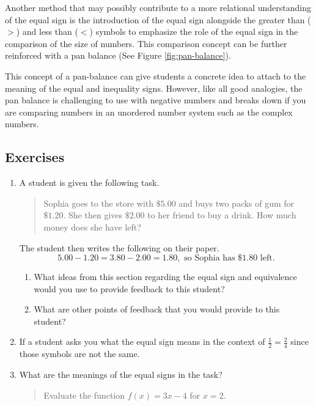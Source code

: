 \documentclass[
]{book}
\theoremstyle{definition}
\theoremstyle{definition}
\theoremstyle{definition}
\theoremstyle{definition}
\theoremstyle{remark}
\begin{document}
Another method that may possibly contribute to a more relational understanding of the equal sign is the introduction of the equal sign alongside the greater than (\(>\)) and less than (\(<\)) symbols to emphasize the role of the equal sign in the comparison of the size of numbers. This comparison concept can be further reinforced with a pan balance (See Figure \ref{fig:pan-balance}).

This concept of a pan-balance can give students a concrete idea to attach to the meaning of the equal and inequality signs. However, like all good analogies, the pan balance is challenging to use with negative numbers and breaks down if you are comparing numbers in an unordered number system such as the complex numbers.

\hypertarget{exercises-8}{%
\subsection{Exercises}\label{exercises-8}}

\begin{enumerate}
\def\labelenumi{\arabic{enumi}.}
\item
  A student is given the following task.

  \begin{quote}
  Sophia goes to the store with \(\$5.00\) and buys two packs of gum for \(\$1.20\). She then gives \(\$2.00\) to her friend to buy a drink. How much money does she have left?
  \end{quote}

  The student then writes the following on their paper.
  \[5.00-1.20=3.80-2.00=1.80, \mbox{ so Sophia has } \$1.80 \mbox{ left.}\]

  \begin{enumerate}
  \def\labelenumii{\alph{enumii}.}
  \item
    What ideas from this section regarding the equal sign and equivalence would you use to provide feedback to this student?
  \item
    What are other points of feedback that you would provide to this student?
  \end{enumerate}
\item
  If a student asks you what the equal sign means in the context of \(\frac{1}{2}=\frac{2}{4}\) since those symbols are not the same.
\item
  What are the meanings of the equal signs in the task?

  \begin{quote}
  Evaluate the function \(f(x)=3x-4\) for \(x=2\).
  \end{quote}
\end{enumerate}
\end{document}
